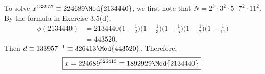 \documentclass[
  coursecode={MTHE 418},
  assignmentname={Homework \homeworknumber},
  studentnumber=20053722,
  name={Bryan Hoang},
  draft,
]{
  ltxanswer%
}
\begin{document}
\begin{questions}
\begin{parts}
\begin{subparts}
        \subpart{}
        \begin{solution}
          To solve \(x^{133957} \equiv 224689 \Mod{2134440}\), we first note that \(N = 2^{3} \cdot 3^{2} \cdot 5 \cdot 7^{2} \cdot 11^{2}\). By the formula in Exercise 3.5(d),
          \begin{align*}
            \phi(2134440) &= 2134440 \biggl(1 - \frac{1}{2}\biggr) \biggl(1 - \frac{1}{3}\biggr) \biggl(1 - \frac{1}{5}\biggr) \biggl(1 - \frac{1}{7}\biggr) \biggl(1 - \frac{1}{11}\biggr) \\
                          &= 443520.
          \end{align*}
          Then \(d \equiv 133957^{-1} \equiv 326413 \Mod{443520}\). Therefore,
          \begin{equation*}
            \boxed{x = 224689^{326413} \equiv 1892929 \Mod{2134440}}.
          \end{equation*}
        \end{solution}
      \end{subparts}
    \end{parts}
  \end{questions}
\end{document}
